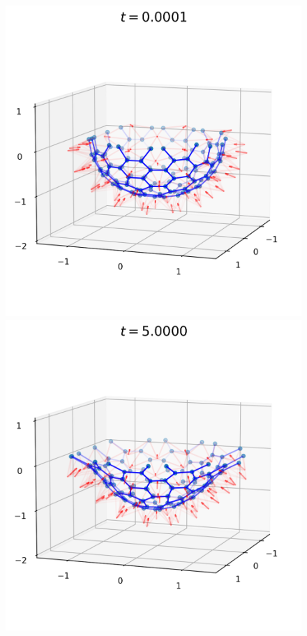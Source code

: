 \begin{landscape}
\begin{figure}[p]
	\centering
	\includegraphics[width=0.4\textheight]{dynamics/00000.png}
	\includegraphics[width=0.4\textheight]{dynamics/02000.png}

\end{figure}
\end{landscape}
